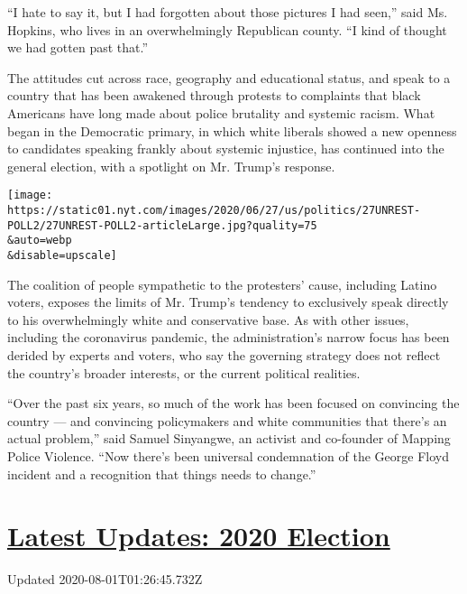``I hate to say it, but I had forgotten about those pictures I had
seen,'' said Ms. Hopkins, who lives in an overwhelmingly Republican
county. ``I kind of thought we had gotten past that.''

The attitudes cut across race, geography and educational status, and
speak to a country that has been awakened through protests to complaints
that black Americans have long made about police brutality and systemic
racism. What began in the Democratic primary, in which white liberals
showed a new openness to candidates speaking frankly about systemic
injustice, has continued into the general election, with a spotlight on
Mr. Trump's response.

\texttt{[image: https://static01.nyt.com/images/2020/06/27/us/politics/27UNREST-POLL2/27UNREST-POLL2-articleLarge.jpg?quality=75\\\&auto=webp\\\&disable=upscale]}

The coalition of people sympathetic to the protesters' cause, including
Latino voters, exposes the limits of Mr. Trump's tendency to exclusively
speak directly to his overwhelmingly white and conservative base. As
with other issues, including the coronavirus pandemic, the
administration's narrow focus has been derided by experts and voters,
who say the governing strategy does not reflect the country's broader
interests, or the current political realities.

``Over the past six years, so much of the work has been focused on
convincing the country --- and convincing policymakers and white
communities that there's an actual problem,'' said Samuel Sinyangwe, an
activist and co-founder of Mapping Police Violence. ``Now there's been
universal condemnation of the George Floyd incident and a recognition
that things needs to change.''

\hypertarget{latest-updates-2020-election}{%
\section{\texorpdfstring{\href{https://www.nytimes.com/2020/07/31/us/elections/biden-vs-trump.html?action=click\&pgtype=Article\&state=default\&region=MAIN_CONTENT_1\&context=storylines_live_updates}{Latest
Updates: 2020
Election}}{Latest Updates: 2020 Election}}\label{latest-updates-2020-election}}

Updated 2020-08-01T01:26:45.732Z


